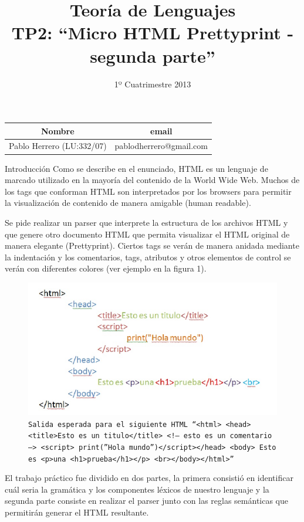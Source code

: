 \documentclass[a4paper,8pt]{article}
\title{Teoría de Lenguajes\\ \textbf{TP2: “Micro HTML Prettyprint - segunda parte”}}
\author{1º Cuatrimestre 2013}
\date{}
\begin{document}
\maketitle

\begin{center}
\vspace{10cm}

\begin{tabular}{|c|c|}
\hline
\hline
\textbf{Nombre}&\textbf{email}\\
\hline
\hline
Pablo Herrero (LU:332/07)   & pablodherrero@gmail.com   \\
\hline
\hline
\end{tabular}
\end{center}

\newpage

\begin{section}{Introducción}
Como se describe en el enunciado, HTML es un lenguaje de marcado utilizado en la mayoría del contenido de la World Wide Web.
Muchos de los tags que conforman HTML son interpretados por los browsers para permitir la visualización de contenido de manera amigable (human readable). 

Se pide realizar un parser que interprete la estructura de los archivos HTML y que genere otro documento HTML que permita visualizar el HTML original de manera elegante (Prettyprint). Ciertos tags se verán de manera anidada mediante la indentación y los comentarios, tags, atributos y otros elementos de control se verán con diferentes colores (ver ejemplo en la figura 1).

\begin{figure}[h!]
  \centering
  \includegraphics[scale=0.70]{salida.png}
  \caption{\texttt{Salida esperada para el siguiente HTML ``$<html> <head><title>$Esto es un titulo$</title> <!–$ esto es un comentario $–> <script> print($”Hola mundo”$)</script></head> <body>$ Esto es $<p>$una $<h1>$prueba$</h1></p> <br></body></html>$''}}
\end{figure}

El trabajo práctico fue dividido en dos partes, la primera consistió en identificar cuál seria la gramática y los componentes léxicos de nuestro lenguaje y la segunda parte consiste en realizar el parser junto con las reglas semánticas que permitirán generar el HTML resultante.
 


\end{section}
\end{document}
